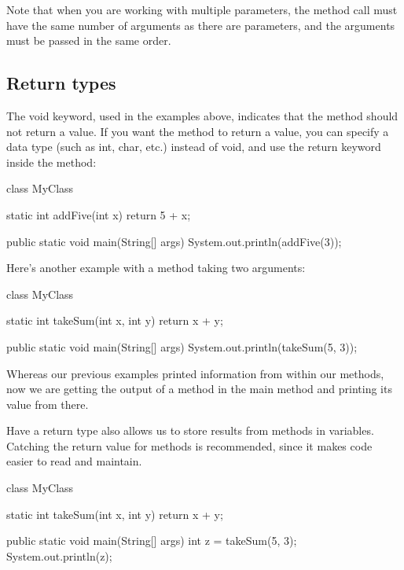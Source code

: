  Note that when you are working with multiple parameters, the method call must have the same number of arguments as there are parameters, and the arguments must be passed in the same order.

\subsection{Return types}
The void keyword, used in the examples above, indicates that the method should not return a value. If you want the method to return a value, you can specify a data type (such as int, char, etc.) instead of void, and use the return keyword inside the method: 

\begin{code}
class MyClass {
  static int addFive(int x) {
    return 5 + x;
  }

  public static void main(String[] args) {
    System.out.println(addFive(3));
  }
}
\end{code}

Here's another example with a method taking two arguments:

\begin{code}
class MyClass {
  static int takeSum(int x, int y) {
    return x + y;
  }

  public static void main(String[] args) {
    System.out.println(takeSum(5, 3));
  }
}
\end{code}


Whereas our previous examples printed information from within our methods, now we are getting the output of a method in the main method and printing its value from there. 

Have a return type also allows us to store results from methods in variables. Catching the return value for methods is recommended, since it makes code easier to read and maintain. 

\begin{code}
class MyClass {
  static int takeSum(int x, int y) {
    return x + y;
  }

  public static void main(String[] args) {
    int z = takeSum(5, 3);
    System.out.println(z);
  }
}
\end{code}

